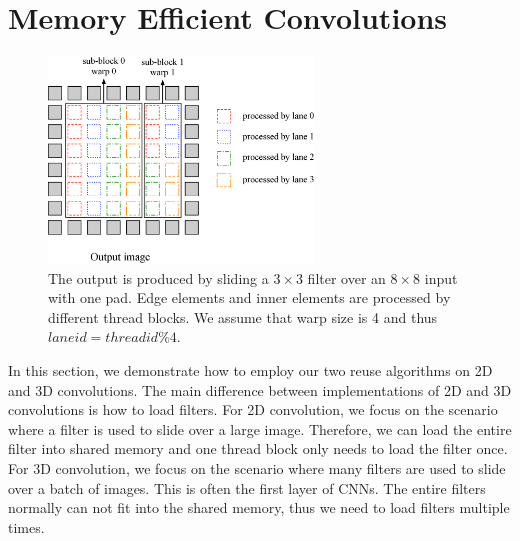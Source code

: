 \section{Memory Efficient Convolutions}
\begin{figure}
	\centering
	\includegraphics[width=0.9\columnwidth,height=5.5cm]{./figure/overalldesign.eps}
\caption{The output is produced by sliding a $3 \times 3$ filter over an $8 \times 8$ input with one pad. Edge elements and inner elements are processed by different {\color{red}thread blocks}. We assume that {\color{red}warp size} is 4 and thus $laneid=threadid\%4$.}
\label{fig:overalldesign}
\end{figure}


In this section, we demonstrate how to employ our two reuse algorithms on 2D and 3D convolutions. The main difference between
implementations of 2D and 3D convolutions is how to load filters. For 2D convolution, we focus on the scenario where a filter is used to
slide over a large image. Therefore, we can load the entire filter into shared memory and one thread block only needs to load the
filter once. For 3D convolution, we focus on the scenario where many filters are used to slide over a batch of images. This is often the
first layer of CNNs. The entire filters normally can not fit into the shared memory, thus we need to load filters multiple times.


